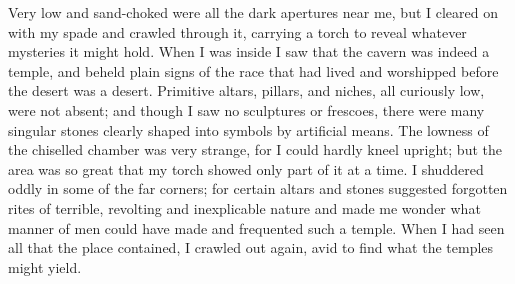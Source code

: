 \documentclass{article}
\begin{document}
Very low and sand-choked were all the dark apertures near me, but I cleared on
with my spade and crawled through it, carrying a torch to reveal whatever
mysteries it might hold. When I was inside I saw that the cavern was indeed a
temple, and beheld plain signs of the race that had lived and worshipped before
the desert was a desert. Primitive altars, pillars, and niches, all curiously
low, were not absent; and though I saw no sculptures or frescoes, there were
many singular stones clearly shaped into symbols by artificial means. The
lowness of the chiselled chamber was very strange, for I could hardly kneel
upright; but the area was so great that my torch showed only part of it at a
time. I shuddered oddly in some of the far corners; for certain altars and
stones suggested forgotten rites of terrible, revolting and inexplicable nature
and made me wonder what manner of men could have made and frequented such a
temple. When I had seen all that the place contained, I crawled out again, avid
to find what the temples might yield.
\end{document}
